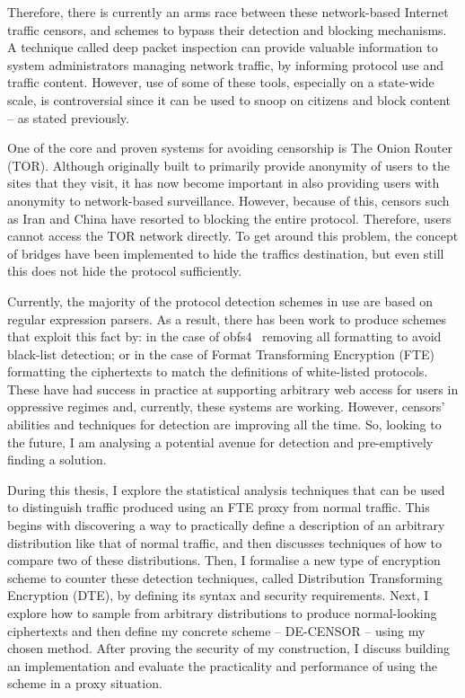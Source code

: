 \documentclass[ %
                    author={Samuel Russell},
                supervisor={Prof. Bogdan Warinschi},
                    degree={MEng},
                     title={Innocuous Ciphertexts},
                  subtitle={The DE-CENSOR Scheme},
                      type={Research},
                      year={2018} ]{dissertation}
\begin{document}
Therefore, there is currently an arms race between these network-based Internet traffic censors, and schemes to bypass their detection and blocking mechanisms.
A technique called deep packet inspection can provide valuable information to system administrators managing network traffic, by informing protocol use and traffic content.
However, use of some of these tools, especially on a state-wide scale, is controversial since it can be used to snoop on citizens and block content -- as stated previously.

One of the core and proven systems for avoiding censorship is The Onion Router (TOR).
Although originally built to primarily provide anonymity of users to the sites that they visit, it has now become important in also providing users with anonymity to network-based surveillance.
However, because of this, censors such as Iran and China have resorted to blocking the entire protocol.
Therefore, users cannot access the TOR network directly.
To get around this problem, the concept of bridges have been implemented to hide the traffics destination, but even still this does not hide the protocol sufficiently.

Currently, the majority of the protocol detection schemes in use are based on regular expression parsers.
As a result, there has been work to produce schemes that exploit this fact by: in the case of obfs4~\cite{obfs4} removing all formatting to avoid black-list detection; or in the case of Format Transforming Encryption (FTE) formatting the ciphertexts to match the definitions of white-listed protocols.
These have had success in practice at supporting arbitrary web access for users in oppressive regimes and, currently, these systems are working.
However, censors' abilities and techniques for detection are improving all the time. So, looking to the future, I am analysing a potential avenue for detection and pre-emptively finding a solution.

During this thesis, I explore the statistical analysis techniques that can be used to distinguish traffic produced using an FTE proxy from normal traffic.
This begins with discovering a way to practically define a description of an arbitrary distribution like that of normal traffic, and then discusses techniques of how to compare two of these distributions.
Then, I formalise a new type of encryption scheme to counter these detection techniques, called Distribution Transforming Encryption (DTE), by defining its syntax and security requirements.
Next, I explore how to sample from arbitrary distributions to produce normal-looking ciphertexts and then define my concrete scheme -- DE-CENSOR -- using my chosen method.
After proving the security of my construction, I discuss building an implementation and evaluate the practicality and performance of using the scheme in a proxy situation.
\end{document}
